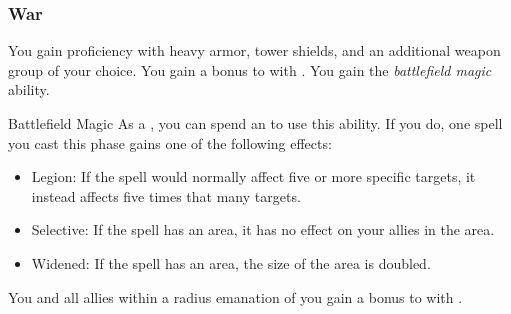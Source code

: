         \subsubsection{War}
             You gain proficiency with heavy armor, tower shields, and an additional weapon group of your choice.
             You gain a  bonus to  with .
             You gain the \textit{battlefield magic} ability.
            \begin{ability}{Battlefield Magic}
                As a , you can spend an  to use this ability.
                If you do, one spell you cast this phase gains one of the following effects:
                \begin{itemize}
                    \item Legion: If the spell would normally affect five or more specific targets, it instead affects five times that many targets.
                    \item Selective: If the spell has an area, it has no effect on your allies in the area.
                    \item Widened: If the spell has an area, the size of the area is doubled.
                \end{itemize}
            \end{ability}
             You and all allies within a \arealarge radius emanation of you gain a  bonus to  with .

